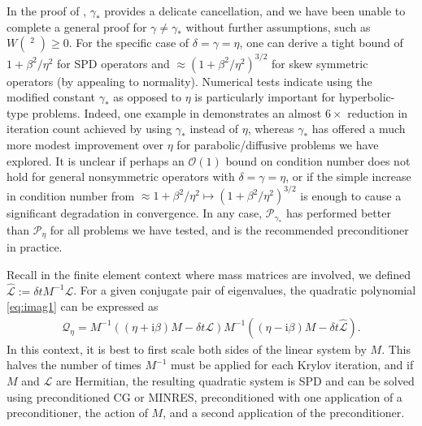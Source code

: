 \documentclass[review]{siamart}
\DeclareMathOperator{\cL}{\widehat{\mathcal{L}}}
\begin{document}
In the proof of , $\gamma_*$ provides a delicate cancellation, and
we have been unable to complete a general proof for $\gamma\neq\gamma_*$ without
further assumptions, such as $W(\cL^2)\geq 0$. For the specific case of $\delta=
\gamma=\eta$, one can derive a tight bound of $1+\beta^2/\eta^2$ for SPD
operators and $\approx (1 + \beta^2/\eta^2)^{3/2}$ for skew symmetric operators
(by appealing to normality). Numerical tests indicate using the modified
constant $\gamma_*$ as opposed to $\eta$ is particularly important for
hyperbolic-type problems. Indeed, one example in 
demonstrates an almost $6\times$ reduction in iteration count achieved by using
$\gamma_*$ instead of $\eta$, whereas $\gamma_*$ has offered a much more modest
improvement over $\eta$ for parabolic/diffusive problems we have explored. It is
unclear if perhaps an $\mathcal{O}(1)$ bound on condition number does not hold
for general nonsymmetric operators with $\delta=\gamma=\eta$, or if the simple
increase in condition number from $\approx 1+\beta^2/\eta^2 \mapsto
(1+\beta^2/\eta^2)^{3/2}$ is enough to cause a significant degradation in
convergence. In any case, $\mathcal{P}_{\gamma_*}$ has performed better than
$\mathcal{P}_{\eta}$ for all problems we have tested, and is the recommended
preconditioner in practice. 

\begin{remark}
Recall in the finite element context where mass matrices are involved, we defined
$\widehat{\mathcal{L}} := \delta t M^{-1}\mathcal{L}$. For a given conjugate pair
of eigenvalues, the quadratic polynomial \eqref{eq:imag1} can be expressed as
%
\begin{align}\label{eq:scaleM}
\mathcal{Q}_\eta = M^{-1}((\eta + \mathrm{i} \beta)M - \delta t{\mathcal{L}})M^{-1}((\eta - \mathrm{i} \beta)M -
	\delta t\widehat{\mathcal{L}}).
\end{align}
%
In this context, it is best to first scale both sides of the linear system by $M$.
This halves the number of times $M^{-1}$ must be applied for each Krylov iteration,
and if $M$ and $\mathcal{L}$ are Hermitian, the resulting quadratic system is SPD
and can be solved using preconditioned CG or MINRES, preconditioned
with one application of a preconditioner, the action of $M$, and a second application
of the preconditioner.
\end{remark}
\end{document}
